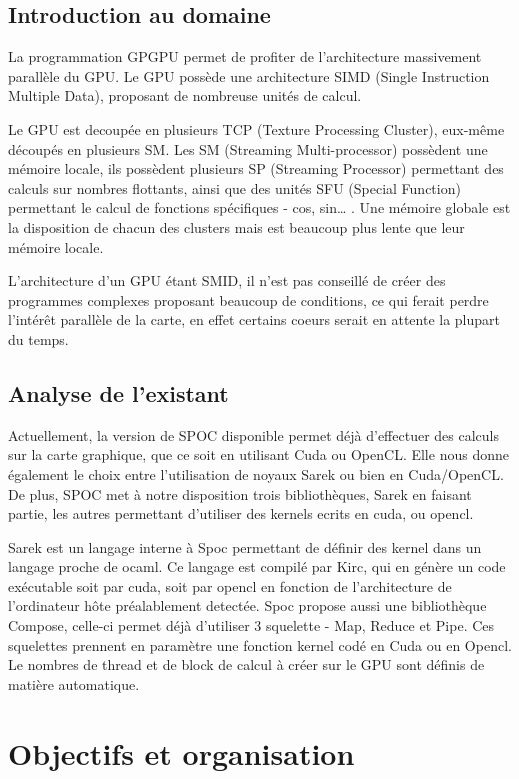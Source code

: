 \documentclass{report}
\begin{document}
\section{Introduction au domaine}
La programmation GPGPU permet de profiter de l’architecture massivement parallèle du GPU. Le GPU possède une architecture SIMD (Single Instruction Multiple Data), proposant de nombreuse unités de calcul. 

Le GPU est decoupée en plusieurs TCP (Texture Processing Cluster), eux-même découpés en plusieurs SM. Les SM (Streaming Multi-processor) possèdent une mémoire locale, ils possèdent plusieurs SP (Streaming Processor) permettant des calculs sur nombres flottants, ainsi que des unités SFU (Special Function) permettant le calcul de fonctions spécifiques - cos, sin… . Une mémoire globale est la disposition de chacun des clusters mais est beaucoup plus lente que leur mémoire locale.

L’architecture d’un GPU étant SMID, il n’est pas conseillé de créer des programmes complexes proposant beaucoup de conditions, ce qui ferait perdre l'intérêt parallèle de la carte, en effet certains coeurs serait en attente la plupart du temps. 

\section{Analyse de l'existant}
Actuellement, la version de SPOC disponible permet déjà d’effectuer des calculs sur la carte graphique, que ce soit en utilisant Cuda ou OpenCL. Elle nous donne également le choix entre l’utilisation de noyaux Sarek ou bien en Cuda/OpenCL. De plus, SPOC met à notre disposition trois bibliothèques, Sarek en faisant partie, les autres permettant d’utiliser des kernels ecrits en cuda, ou opencl.

Sarek est un langage interne à Spoc permettant de définir des kernel dans un langage proche de ocaml. Ce langage est compilé par Kirc, qui en génère un code exécutable soit par cuda, soit par opencl en fonction de l’architecture de l’ordinateur hôte préalablement detectée.
Spoc propose aussi une bibliothèque Compose, celle-ci permet déjà d’utiliser 3 squelette - Map, Reduce et Pipe. Ces squelettes prennent en paramètre une fonction kernel codé en Cuda ou en Opencl. Le nombres de thread et de block de calcul à créer sur le GPU sont définis de matière automatique. 
  
\chapter{Objectifs et organisation}
\end{document}
